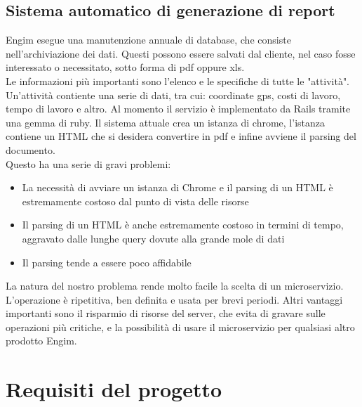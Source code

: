 \documentclass[12pt]{article}
\begin{document}
\subsection{Sistema automatico di generazione di report}
Engim esegue una manutenzione annuale di database, che consiste nell'archiviazione
dei dati. Questi possono essere salvati dal cliente, nel caso fosse interessato 
o necessitato, sotto forma di pdf oppure xls.
\\ 
Le informazioni più importanti sono l'elenco e le specifiche di tutte le "attività". 
Un'attività contiente una serie di dati, tra cui: coordinate
gps, costi di lavoro, tempo di lavoro e altro.  
Al momento il servizio è implementato da Rails tramite una gemma di ruby. 
Il sistema attuale crea un istanza di chrome, l'istanza contiene un HTML
che si desidera convertire in pdf e infine avviene il parsing del documento.
\\ Questo ha una serie di gravi problemi:
\begin{itemize}
  \item La necessità di avviare un istanza di Chrome e il parsing di un HTML è
  estremamente costoso dal punto di vista delle risorse
  \item Il parsing di un HTML è anche estremamente costoso in termini di tempo,
  aggravato dalle lunghe query dovute alla grande mole di dati 
  \item Il  parsing tende a essere poco affidabile
\end{itemize}
La natura del nostro problema rende molto facile la scelta di un microservizio.
L'operazione è ripetitiva, ben definita e usata per brevi periodi. Altri vantaggi 
importanti sono il risparmio di risorse del server, che evita di gravare sulle 
operazioni più critiche, e la possibilità di usare il microservizio per qualsiasi 
altro prodotto Engim.


\section{Requisiti del progetto}
\end{document}
